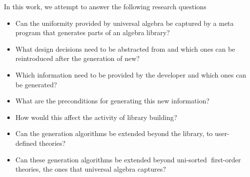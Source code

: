 


In this work, we attempt to answer the following research questions 
\begin{itemize}
    \item Can the uniformity provided by universal algebra be captured by a meta program that generates parts of an algebra library?
    \item What design decisions need to be abstracted from and which ones can be reintroduced after the generation of new?
    \item Which information need to be provided by the developer and which ones can be generated? 
    \item What are the preconditions for generating this new information? 
    \item How would this affect the activity of library building?
    \item Can the generation algorithms be extended beyond the library, to user-defined theories?
    \item Can these generation algorithms be extended beyond uni-sorted first-order theories, the ones that universal algebra captures? 
\end{itemize}

